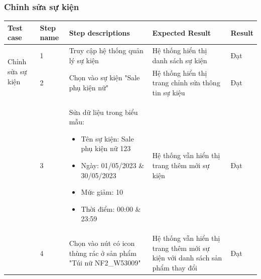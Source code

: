 \subsubsection{Chỉnh sửa sự kiện}
{
    \setlength\extrarowheight{6pt}
    \begin{longtable}{| p{2.5cm}| p{1cm}| p{5.5cm}| p{4.5cm} | p{1.5cm} |}
        \hline
        \textbf{Test case}                            & \textbf{Step name}                           & \textbf{Step descriptions}                                     & \textbf{Expected Result}                                                     & \textbf{Result} \\
        \hline
        \multirow[t]{2}{2.5cm}{Chỉnh sửa sự kiện}     & 1                                            & Truy cập hệ thống quản lý sự kiện                              & Hệ thống hiển thị danh sách sự kiện                                          & Đạt             \\
        \cline{2-5}
                                                      & 2                                            & Chọn vào sự kiện "Sale phụ kiện nữ"                            & Hệ thống hiển thị trang chỉnh sửa thông tin sự kiệu                          & Đạt             \\
        \cline{2-5}
                                                      & 3                                            & Sửa dữ liệu trong biểu mẫu:
        \begin{itemize}
            \item Tên sự kiện: Sale phụ kiện nữ 123
            \item Ngày: 01/05/2023 \& 30/05/2023
            \item Mức giảm: 10
            \item Thời điểm: 00:00 \& 23:59
        \end{itemize}       & Hệ thống vẫn hiển thị trang thêm mới sự kiện & Đạt                                                                                                                                                                                       \\
        \cline{2-5}
                                                      & 4                                            & Chọn vào nút có icon thùng rác ở sản phẩm "Túi nữ NF2\_W53009" & Hệ thống vẫn hiển thị trang thêm mới sự kiện với danh sách sản phẩm thay đổi & Đạt             \\

\end{longtable}}

